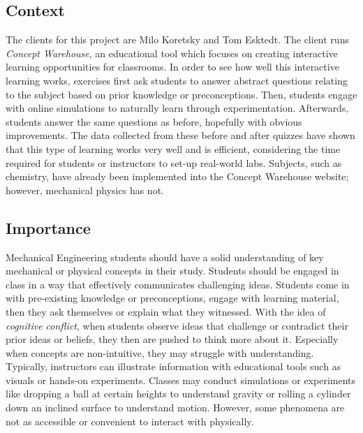 \subsection{Context}
The clients for this project are Milo Koretsky and Tom Esktedt. 
The client runs \textit{Concept Warehouse}, an educational tool which focuses on creating interactive learning opportunities for classrooms. In order to see how well this interactive learning works, exercises first ask students to answer abstract questions relating to the subject based on prior knowledge or preconceptions. Then, students engage with online simulations to naturally learn through experimentation. Afterwards, students answer the same questions as before, hopefully with obvious improvements. The data collected from these before and after quizzes have shown that this type of learning works very well and is efficient, considering the time required for students or instructors to set-up real-world labs. Subjects, such as chemistry, have already been implemented into the Concept Warehouse website; however, mechanical physics has not.


\subsection{Importance}
Mechanical Engineering students should have a solid understanding of key mechanical or physical concepts in their study. Students should be engaged in class in a way that effectively communicates challenging ideas. Students come in with pre-existing knowledge or preconceptions, engage with learning material, then they ask themselves or explain what they witnessed. With the idea of \textit{cognitive conflict}, when students observe ideas that challenge or contradict their prior ideas or beliefs, they then are pushed to think more about it. Especially when concepts are non-intuitive, they may struggle with understanding. Typically, instructors can illustrate information with educational tools such as visuals or hands-on experiments. Classes may conduct simulations or experiments like dropping a ball at certain heights to understand gravity or rolling a cylinder down an inclined surface to understand motion. However, some phenomena are not as accessible or convenient to interact with physically.\newline

